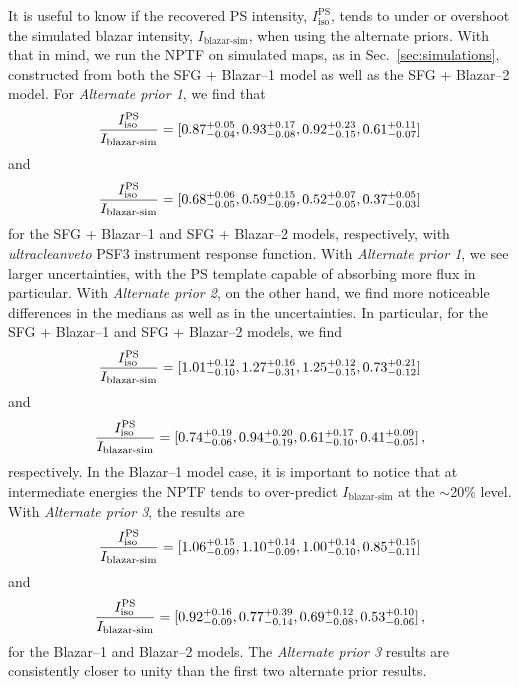 It is useful to know if the recovered PS intensity, $I_\text{iso}^\text{PS}$, tends to under or overshoot the simulated blazar intensity, $I_\text{blazar-sim}$, when using the alternate priors.  With that in mind, we run the NPTF on simulated maps, as in Sec.~\ref{sec:simulations}, constructed from both the SFG + Blazar--1 model as well as the SFG + Blazar--2 model.   For \emph{Alternate prior 1}, we find that
\begin{equation}
{I_\text{iso}^\text{PS} \over I_\text{blazar-sim}} = [0.87_{-0.04}^{+0.05},0.93_{-0.08}^{+0.17},0.92_{-0.15}^{+0.23},0.61_{-0.07}^{+0.11}]  \nonumber
\end{equation}
and
\begin{equation}
{I_\text{iso}^\text{PS} \over I_\text{blazar-sim}} = [0.68_{-0.05}^{+0.06},0.59_{-0.09}^{+0.15},0.52_{-0.05}^{+0.07},0.37_{-0.03}^{+0.05}]  \nonumber
\end{equation} 
for the SFG + Blazar--1 and SFG + Blazar--2 models, respectively, with {\it ultracleanveto} PSF3 instrument response function.
With {\it Alternate prior 1}, we see larger uncertainties, with the PS template capable of absorbing more flux in particular.  With \emph{Alternate prior 2}, on the other hand, we find more noticeable differences in the medians as well as in the uncertainties.  In particular, for the SFG + Blazar--1 and SFG + Blazar--2 models, we find
\begin{equation}
{I_\text{iso}^\text{PS} \over I_\text{blazar-sim}} = [1.01_{-0.10}^{+0.12}, 1.27_{-0.31}^{+0.16}, 1.25_{-0.15}^{+0.12}, 0.73_{-0.12}^{+0.21}]  \nonumber
\end{equation}
and
\begin{equation}
{I_\text{iso}^\text{PS} \over I_\text{blazar-sim} }= [0.74_{-0.06}^{+0.19}, 0.94_{-0.19}^{+0.20}, 0.61_{-0.10}^{+0.17}, 0.41_{-0.05}^{+0.09}] \,, \nonumber
\end{equation} 
respectively.  In the Blazar--1 model case, it is important to notice that at intermediate energies the NPTF tends to over-predict $I_\text{blazar-sim}$ at the $\sim$20\% level.  With \emph{Alternate prior 3}, the results are 
\begin{equation}
{I_\text{iso}^\text{PS} \over I_\text{blazar-sim}} = [1.06_{-0.09}^{+0.15}, 1.10_{-0.09}^{+0.14}, 1.00_{-0.10}^{+0.14}, 0.85_{-0.11}^{+0.15}]  \nonumber
\end{equation}
and
\begin{equation}
{I_\text{iso}^\text{PS} \over I_\text{blazar-sim}} = [0.92_{-0.09}^{+0.16}, 0.77_{-0.14}^{+0.39}, 0.69_{-0.08}^{+0.12}, 0.53_{-0.06}^{+0.10}] \,, \nonumber
\end{equation} 
for the Blazar--1 and Blazar--2 models.  The \emph{Alternate prior 3} results are consistently closer to unity than the first two alternate prior results. 

